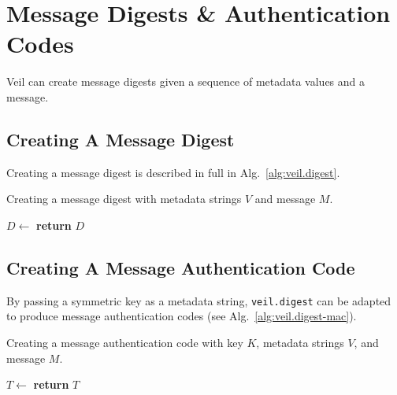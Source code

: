 \section{Message Digests \& Authentication Codes}\label{sec:veil.digest}

Veil can create message digests given a sequence of metadata values and a message.

\subsection{Creating A Message Digest}\label{subsec:veil.digest-digest}

Creating a message digest is described in full in Alg.~\ref{alg:veil.digest}\@.

\begin{algorithm}
    \caption{Creating a message digest with metadata strings $V$ and message $M$.}
    \begin{algorithmic}
        \State {}
        \State {}
        \EndFor
        \State {}
        \State $D \gets $
        \State \textbf{return} $D$
        \EndFunction
    \end{algorithmic}\label{alg:veil.digest}
\end{algorithm}

\subsection{Creating A Message Authentication Code}\label{subsec:veil.digest-mac}

By passing a symmetric key as a metadata string, \texttt{veil.digest} can be adapted to produce
message authentication codes (see Alg.~\ref{alg:veil.digest-mac}).

\begin{algorithm}
    \caption{Creating a message authentication code with key $K$, metadata strings $V$, and message
        $M$.}
    \begin{algorithmic}
        \State $T \gets $
        \State \textbf{return} $T$
        \EndFunction
    \end{algorithmic}\label{alg:veil.digest-mac}
\end{algorithm}

